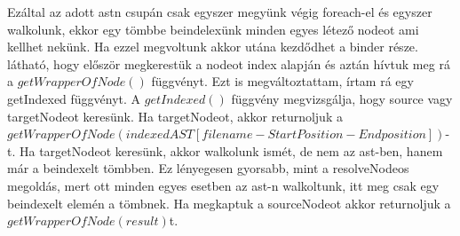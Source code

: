 Ezáltal az adott astn csupán csak egyszer megyünk végig foreach-el és egyszer walkolunk, ekkor egy tömbbe beindelexünk minden egyes létező nodeot ami kellhet nekünk.
Ha ezzel megvoltunk akkor utána kezdődhet a binder része.
 látható, hogy először megkerestük a nodeot index alapján és aztán hívtuk meg rá a ${getWrapperOfNode()}$ függvényt.
Ezt is megváltoztattam, írtam rá egy getIndexed függvényt.
A ${getIndexed()}$ függvény megvizsgálja, hogy source vagy targetNodeot keresünk. Ha targetNodeot, akkor returnoljuk a ${getWrapperOfNode(indexedAST[filename-StartPosition-Endposition])}$-t.
Ha targetNodeot keresünk, akkor walkolunk ismét, de nem az ast-ben, hanem már a beindexelt tömbben.
Ez lényegesen gyorsabb, mint a resolveNodeos megoldás, mert ott minden egyes esetben az ast-n walkoltunk, itt meg csak egy beindexelt elemén a tömbnek.
Ha megkaptuk a sourceNodeot akkor returnoljuk a ${getWrapperOfNode(result)}$t.
